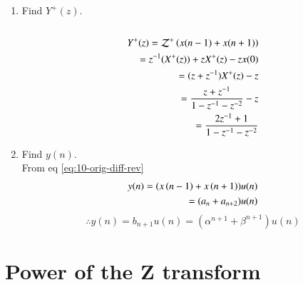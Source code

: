\documentclass[journal,12pt,twocolumn]{IEEEtran}
\renewcommand\thesection{\arabic{section}}
\begin{document}
\begin{enumerate}[label=\thesection.\arabic*,ref=\thesection.\theenumi]
\item Find $Y^{+}(z)$. \\
\solution\\
\begin{align}
	Y^{+}(z) = \mathcal{Z}^{+}\left(x(n-1) + x(n+1)\right)\\
	= z^{-1}(X^{+}(z)) + zX^{+}(z) - zx(0)\\
	= (z + z^{-1})X^{+}(z) - z\\
	= \frac{z + z^{-1}}{1 - z^{-1} - z^{-2}} - z\\
	= \frac{2z^{-1} + 1}{1 - z^{-1} - z^{-2}}
\end{align}
\item Find $y(n)$.\\
\solution From eq \eqref{eq:10-orig-diff-rev}
\begin{align}
	y(n) = (x\left(n-1\right) + x\left(n+1\right))u(n)\\
	= (a_n + a_{n+2})u(n)
\end{align}
\begin{equation}
\therefore	y(n)= b_{n+1}u(n) = (\alpha^{n+1} + \beta^{n+1})u(n)
\label{eq:yndef}
\end{equation}
\end{enumerate}\section{Power of the Z transform}
\end{document}
